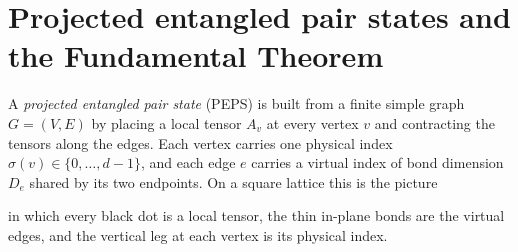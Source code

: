 
\chapter{Projected entangled pair states and the Fundamental Theorem}%
\label{ch:peps_ft}

A \emph{projected entangled pair state} (PEPS) is built from a finite simple
graph $G=(V,E)$ by placing a local tensor $A_v$ at every vertex $v$ and
contracting the tensors along the edges. Each vertex carries one physical index
$\sigma(v)\in\{0,\ldots,d-1\}$, and each edge $e$ carries a virtual index of
bond dimension $D_e$ shared by its two endpoints. On a square lattice this is
the picture

in which every black dot is a local tensor, the thin in-plane bonds are the
virtual edges, and the vertical leg at each vertex is its physical index.

